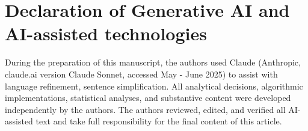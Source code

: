 \documentclass[fleqn,10pt,lineno]{wlpeerj}
\begin{document}
\section*{Declaration of Generative AI and AI-assisted technologies}
During the preparation of this manuscript, the authors used Claude 
(Anthropic, claude.ai version Claude Sonnet, 
accessed May - June 2025) to assist with language refinement, sentence 
simplification. All analytical decisions, 
algorithmic implementations, statistical analyses, and substantive 
content were developed independently by the authors. The authors 
reviewed, edited, and verified all AI-assisted text and take full 
responsibility for the final content of this article.


\end{document}
